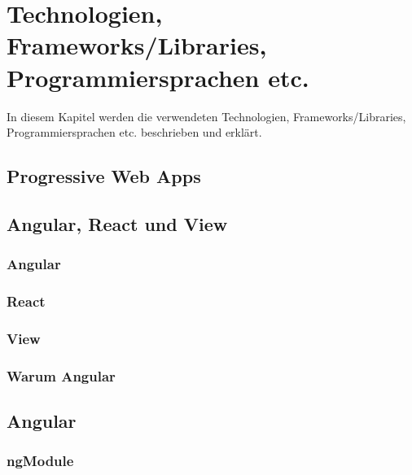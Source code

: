 %
\chapter{Technologien, Frameworks/Libraries, Programmiersprachen etc.}
\label{sec:technologies}


In diesem Kapitel werden die verwendeten Technologien, Frameworks/Libraries, Programmiersprachen etc. beschrieben und erklärt.

\section{Progressive Web Apps}
\label{sec:technologies:pwa}


\section{Angular, React und View}
\label{sec:technologies:frameworks}

\subsection{Angular}
\label{sec:technologies:frameworks:angular}

\subsection{React}
\label{sec:technologies:frameworks:react}

\subsection{View}
\label{sec:technologies:frameworks:view}

\subsection{Warum Angular}
\label{sec:technologies:frameworks:why}

\section{Angular}
\label{sec:technologies:angular}

\subsection{ngModule}
\label{sec:technologies:angular:module}

